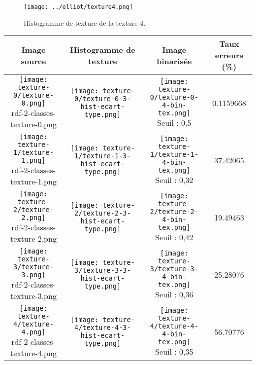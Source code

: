 \documentclass[11pt]{article}
\begin{document}
  \begin{figure}[H]
    \center
    \texttt{[image: ../elliot/texture4.png]}
    \caption{Histogramme de texture de la texture 4.}
  \end{figure}
  
     \begin{center}
    \begin{tabular}{|c|c|c|c|}
      \hline
      \textbf{Image source} & \textbf{Histogramme de texture} & \textbf{Image binarisée} & \textbf{Taux erreurs (\%)}\\
      \hline
      \shortstack{\texttt{[image: texture-0/texture-0.png]} \\ \tiny{rdf-2-classes-texture-0.png}} & \texttt{[image: texture-0/texture-0-3-hist-ecart-type.png]} & \shortstack{\texttt{[image: texture-0/texture-0-4-bin-tex.png]} \\ \small{Seuil : 0,5}  } & 0.1159668\\
      \hline
      \shortstack{\texttt{[image: texture-1/texture-1.png]} \\ \tiny{rdf-2-classes-texture-1.png}} & \texttt{[image: texture-1/texture-1-3-hist-ecart-type.png]} & \shortstack{\texttt{[image: texture-1/texture-1-4-bin-tex.png]} \\ \small{Seuil : 0,32} } & 37.42065\\
      \hline
      \shortstack{\texttt{[image: texture-2/texture-2.png]} \\ \tiny{rdf-2-classes-texture-2.png}} & \texttt{[image: texture-2/texture-2-3-hist-ecart-type.png]} & \shortstack{\texttt{[image: texture-2/texture-2-4-bin-tex.png]} \\ \small{Seuil : 0,42} } & 19.49463\\
      \hline
      \shortstack{\texttt{[image: texture-3/texture-3.png]} \\ \tiny{rdf-2-classes-texture-3.png}} & \texttt{[image: texture-3/texture-3-3-hist-ecart-type.png]} & \shortstack{\texttt{[image: texture-3/texture-3-4-bin-tex.png]} \\ \small{Seuil : 0,36} } & 25.28076\\
      \hline
      \shortstack{\texttt{[image: texture-4/texture-4.png]} \\ \tiny{rdf-2-classes-texture-4.png}} & \texttt{[image: texture-4/texture-4-3-hist-ecart-type.png]} & \shortstack{\texttt{[image: texture-4/texture-4-4-bin-tex.png]} \\ \small{Seuil : 0,35}  } & 56.70776\\
      \hline
    \end{tabular}
  \end{center}
  
\end{document}
